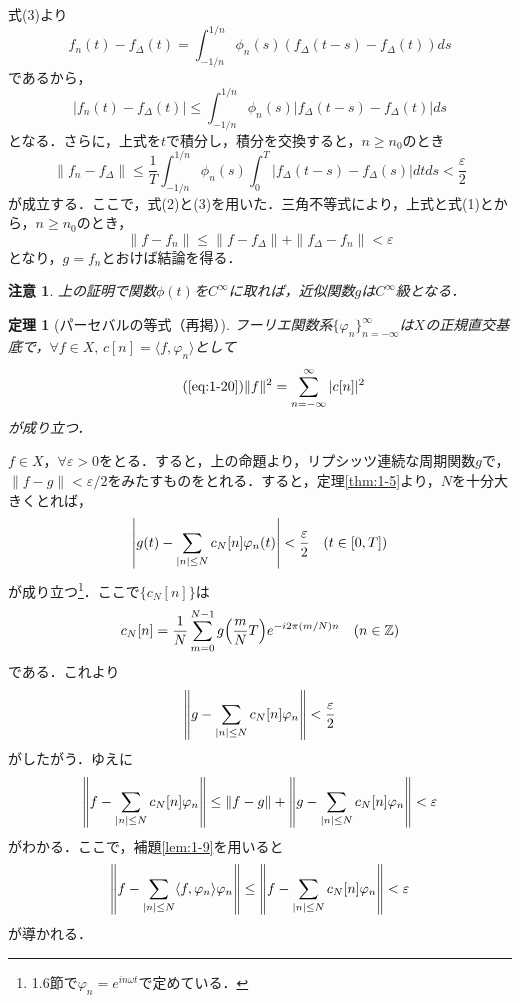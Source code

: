 \documentclass[dvipdfmx,a4j,10pt]{jsarticle}
\makeatletter
\theoremstyle{mystyle1}
\newtheorem{theorem}[definition]{定理}
\theoremstyle{mystyle3}
\theoremstyle{mystyle4}
\theoremstyle{mystyle2}
\newtheorem{note*}{注意}
\renewenvironment{proof}[1][\proofname]{\par
  \pushQED{\qed}%
  \normalfont
  \topsep6\p@\@plus6\p@ \trivlist
  \item[\hskip\labelsep{\bfseries\sffamily #1}]\ignorespaces
}{%
  \popQED\endtrivlist\@endpefalse
}
\renewcommand\proofname{証明}
\newenvironment{thm}[1][]
{\begin{tcolorbox}[
    enhanced,
    boxrule=0pt,
    arc=0mm,
    frame hidden,
    borderline west={2pt}{-4pt}{red},
    breakable = true
    ]
    \begin{theorem}[#1]
}
{\end{theorem}\end{tcolorbox}}
\makeatother
\begin{document}
\begin{proof}
    式(3)より
    \[
        f_n(t)-f_\Delta(t)=\int_{-1/n}^{1/n} \phi_n(s)(f_\Delta(t-s)-f_\Delta(t))ds
    \]
    であるから，
    \[
        |f_n(t)-f_\Delta(t)|\leq\int_{-1/n}^{1/n}\phi_n(s)|f_\Delta(t-s)-f_\Delta(t)|ds
    \]
    となる．さらに，上式を$t$で積分し，積分を交換すると，$n\geq n_0$のとき
    \[
        \|f_n-f_\Delta\|\leq\frac{1}{T}\int_{-1/n}^{1/n}\phi_n(s)\int_0^T|f_\Delta(t-s)-f_\Delta(s)|dtds<\frac{\varepsilon}{2}
    \]
    が成立する．ここで，式(2)と(3)を用いた．三角不等式により，上式と式(1)とから，$n\geq n_0$のとき，
    \[
        \|f-f_n\|\leq\|f-f_\Delta\|+\|f_\Delta-f_n\|<\varepsilon
    \]
    となり，$g=f_n$とおけば結論を得る．
\end{proof}

\begin{note*}
    上の証明で関数$\phi(t)$を$C^\infty$に取れば，近似関数$g$は$C^\infty$級となる．
\end{note*}

\setcounter{definition}{5}
\begin{thm}[パーセバルの等式（再掲）]
    フーリエ関数系$\{\varphi_n\}_{n=-\infty}^\infty$は$X$の正規直交基底で，$\forall f\in X,\, c[n]=\langle f,\varphi_n\rangle$として
    \begin{equation}\tag{\ref{eq:1-20}}
        \|f\|^2=\sum_{n=-\infty}^\infty |c[n]|^2
    \end{equation}
    が成り立つ．
\end{thm}

\begin{proof}
    $f\in X$，$\forall\varepsilon>0$をとる．すると，上の命題より，リプシッツ連続な周期関数$g$で，$\|f-g\|<\varepsilon/2$をみたすものをとれる．すると，定理\ref{thm:1-5}より，$N$を十分大きくとれば，
    \[
        \mleft|g(t)-\sum_{|n|\leq N}c_N[n]\varphi_n(t)\mright|<\frac{\varepsilon}{2}\quad(t\in [0,T])
    \]
    が成り立つ\footnote{1.6節で$\varphi_n=e^{in\omega t}$で定めている．}．ここで$\{c_N[n]\}$は
    \[
        c_N[n]=\frac{1}{N}\sum_{m=0}^{N-1}g\mleft(\frac{m}{N}T\mright)e^{-i2\pi(m/N)n}\quad(n\in\mathbb{Z})
    \]
    である．これより
    \[
        \mleft\|g-\sum_{|n|\leq N}c_N[n]\varphi_n\mright\|<\frac{\varepsilon}{2}
    \]
    がしたがう．ゆえに
    \[
        \mleft\|f-\sum_{|n|\leq N}c_N[n]\varphi_n\mright\|\leq\|f-g\|+\mleft\|g-\sum_{|n|\leq N}c_N[n]\varphi_n\mright\|<\varepsilon
    \]
    がわかる．ここで，補題\ref{lem:1-9}を用いると
    \[
        \mleft\|f-\sum_{|n|\leq N}\langle f,\varphi_n\rangle\varphi_n\mright\|\leq\mleft\|f-\sum_{|n|\leq N}c_N[n]\varphi_n\mright\|<\varepsilon
    \]
    が導かれる．
\end{proof}
\end{document}
